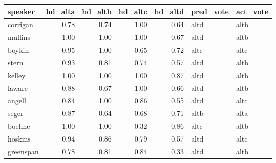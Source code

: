 \begin{tabular}{lrrrrll}
\toprule
   speaker &  hd\_alta &  hd\_altb &  hd\_altc &  hd\_altd & pred\_vote & act\_vote \\
\midrule
  corrigan &     0.78 &     0.74 &     1.00 &     0.64 &      altd &     altb \\
   mullins &     1.00 &     1.00 &     1.00 &     0.67 &      altd &     altb \\
    boykin &     0.95 &     1.00 &     0.65 &     0.72 &      altc &     altc \\
     stern &     0.93 &     0.81 &     0.74 &     0.57 &      altd &     altb \\
    kelley &     1.00 &     1.00 &     1.00 &     0.87 &      altd &     altb \\
    laware &     0.88 &     0.67 &     1.00 &     0.66 &      altd &     altb \\
    angell &     0.84 &     1.00 &     0.86 &     0.55 &      altd &     altc \\
     seger &     0.87 &     0.64 &     0.68 &     0.71 &      altb &     alta \\
    boehne &     1.00 &     1.00 &     0.32 &     0.86 &      altc &     altb \\
   hoskins &     0.94 &     0.86 &     0.79 &     0.57 &      altd &     altc \\
 greenspan &     0.78 &     0.81 &     0.84 &     0.33 &      altd &     altb \\
\bottomrule
\end{tabular}
